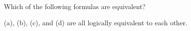 \documentclass[addpoints,12pt]{exam}
\begin{document}
\begin{questions}
\question Which of the following formulas are equivalent?

{(a), (b), (c), and (d)} are all logically equivalent to each other.


\end{questions}
\end{document}
